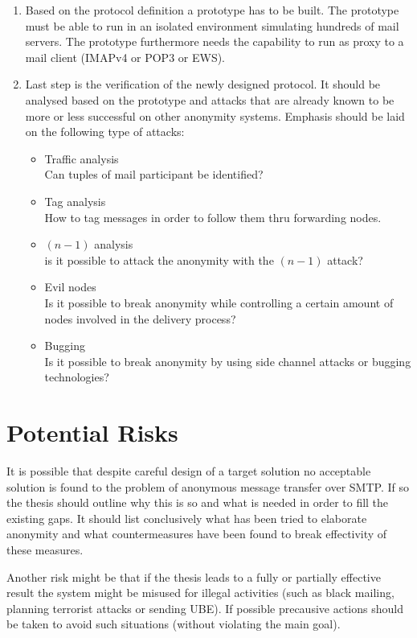 \documentclass[twocolumn,a4paper,10pt,english]{scrartcl}
\newenvironment{myitemize}{\begin{itemize}\setlength{\itemsep}{0em}}{\end{itemize}}
\begin{document}
\begin{enumerate}
\item Based on the protocol definition a prototype has to be built. The prototype must be able to run in an isolated environment simulating hundreds of mail servers. The prototype furthermore needs the capability to run as proxy to a mail client (IMAPv4 or POP3 or EWS).\par

\item Last step is the verification of the newly designed protocol. It should be analysed based on the prototype and attacks that are already known to be more or less successful on other anonymity systems. Emphasis should be laid on the following type of attacks:\par
\begin{myitemize}
\item Traffic analysis\\Can tuples of mail participant be identified?  
\item Tag analysis\\How to tag messages in order to follow them thru forwarding nodes.
\item $(n-1)$ analysis\\is it possible to attack the anonymity with the $(n-1)$ attack?
\item Evil nodes\\ Is it possible to break anonymity while controlling a certain amount of nodes involved in the delivery process?
\item Bugging\\Is it possible to break anonymity by using side channel attacks or bugging technologies?
\end{myitemize}
\end{enumerate}

\section{Potential Risks}
It is possible that despite careful design of a target solution no acceptable solution is found to the problem of anonymous message transfer over SMTP. If so the thesis should outline why this is so and what is needed in order to fill the existing gaps. It should list conclusively what has been tried to elaborate anonymity and what countermeasures have been found to break effectivity of these measures.\par

Another risk might be that if the thesis leads to a fully or partially effective result the system might be misused for illegal activities (such as black mailing, planning terrorist attacks or sending UBE). If possible precausive actions should be taken to avoid such situations (without violating the main goal).\par
\end{document}
